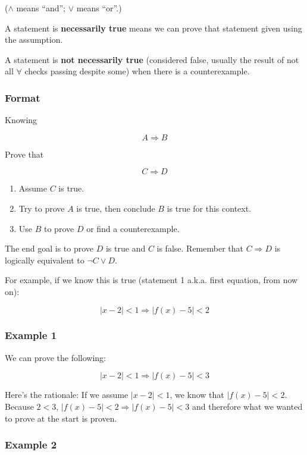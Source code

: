 \documentclass[
]{article}
\newcounter{example}
\begin{document}
($\land$ means ``and''; $\vee$ means ``or''.)

A statement is \textbf{necessarily true} means we can prove that
statement given using the assumption.

A statement is \textbf{not necessarily true} (considered false, usually
the result of not all $\forall$ checks passing despite some) when
there is a counterexample.


\subsubsection{Format}

Knowing

$$A \Rightarrow B$$

Prove that

$$C \Rightarrow D$$

\begin{enumerate}
\def\labelenumi{\arabic{enumi}.}
\item
  Assume $C$ is true.
\item
  Try to prove $A$ is true, then conclude $B$ is true for this
  context.
\item
  Use $B$ to prove $D$ or find a counterexample.
\end{enumerate}

The end goal is to prove $D$ is true and $C$ is false. Remember that
$C \Rightarrow D$ is logically equivalent to $\neg C \vee D$.

For example, if we know this is true (statement 1 a.k.a. first equation,
from now on):

$$|x - 2| < 1 \Rightarrow \left| f(x) - 5 \right| < 2$$


\subsubsection{Example 1}

We can prove the following:

$$|x - 2| < 1 \Rightarrow \left| f(x) - 5 \right| < 3$$

Here's the rationale: If we assume $|x - 2| < 1$, we know that
$\left| f(x) - 5 \right| < 2$. Because $2 < 3$,
$\left| f(x) - 5 \right| < 2 \Rightarrow \left| f(x) - 5 \right| < 3$
and therefore what we wanted to prove at the start is proven.


\subsubsection{Example 2}
\end{document}

